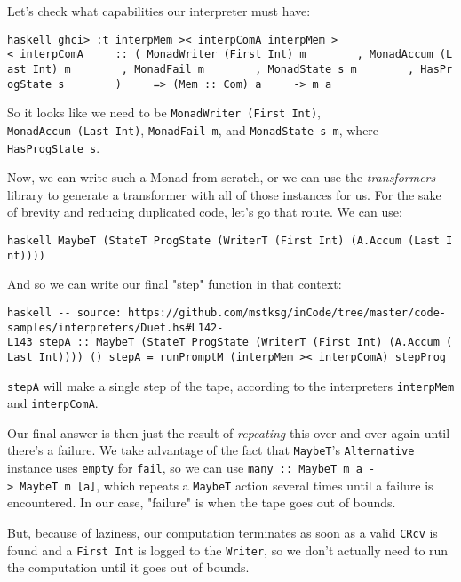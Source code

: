 \documentclass[]{article}
\begin{document}
Let's check what capabilities our interpreter must have:

\texttt{haskell\ ghci\textgreater{}\ :t\ interpMem\ \textgreater{}\textbar{}\textless{}\ interpComA\ interpMem\ \textgreater{}\textbar{}\textless{}\ interpComA\ \ \ \ \ ::\ (\ MonadWriter\ (First\ Int)\ m\ \ \ \ \ \ \ \ ,\ MonadAccum\ (Last\ Int)\ m\ \ \ \ \ \ \ \ ,\ MonadFail\ m\ \ \ \ \ \ \ \ ,\ MonadState\ s\ m\ \ \ \ \ \ \ \ ,\ HasProgState\ s\ \ \ \ \ \ \ \ )\ \ \ \ \ =\textgreater{}\ (Mem\ :\textbar{}:\ Com)\ a\ \ \ \ \ -\textgreater{}\ m\ a}

So it looks like we need to be \texttt{MonadWriter\ (First\ Int)},
\texttt{MonadAccum\ (Last\ Int)}, \texttt{MonadFail\ m}, and
\texttt{MonadState\ s\ m}, where \texttt{HasProgState\ s}.

Now, we can write such a Monad from scratch, or we can use the
\emph{transformers} library to generate a transformer with all of those
instances for us. For the sake of brevity and reducing duplicated code, let's go
that route. We can use:

\texttt{haskell\ MaybeT\ (StateT\ ProgState\ (WriterT\ (First\ Int)\ (A.Accum\ (Last\ Int))))}

And so we can write our final "step" function in that context:

\texttt{haskell\ -\/-\ source:\ https://github.com/mstksg/inCode/tree/master/code-samples/interpreters/Duet.hs\#L142-L143\ stepA\ ::\ MaybeT\ (StateT\ ProgState\ (WriterT\ (First\ Int)\ (A.Accum\ (Last\ Int))))\ ()\ stepA\ =\ runPromptM\ (interpMem\ \textgreater{}\textbar{}\textless{}\ interpComA)\ stepProg}

\texttt{stepA} will make a single step of the tape, according to the
interpreters \texttt{interpMem} and \texttt{interpComA}.

Our final answer is then just the result of \emph{repeating} this over and over
again until there's a failure. We take advantage of the fact that
\texttt{MaybeT}'s \texttt{Alternative} instance uses \texttt{empty} for
\texttt{fail}, so we can use
\texttt{many\ ::\ MaybeT\ m\ a\ -\textgreater{}\ MaybeT\ m\ {[}a{]}}, which
repeats a \texttt{MaybeT} action several times until a failure is encountered.
In our case, "failure" is when the tape goes out of bounds.

But, because of laziness, our computation terminates as soon as a valid
\texttt{CRcv} is found and a \texttt{First\ Int} is logged to the
\texttt{Writer}, so we don't actually need to run the computation until it goes
out of bounds.
\end{document}
